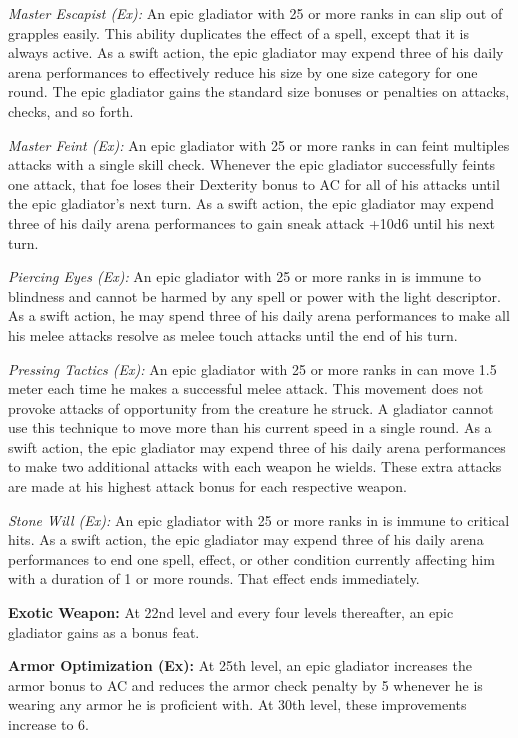 \textit{Master Escapist (Ex):} An epic gladiator with 25 or more ranks in  can slip out of grapples easily. This ability duplicates the effect of a  spell, except that it is always active. As a swift action, the epic gladiator may expend three of his daily arena performances to effectively reduce his size by one size category for one round. The epic gladiator gains the standard size bonuses or penalties on attacks,  checks, and so forth.

\textit{Master Feint (Ex):} An epic gladiator with 25 or more ranks in  can feint multiples attacks with a single skill check. Whenever the epic gladiator successfully feints one attack, that foe loses their Dexterity bonus to AC for all of his attacks until the epic gladiator's next turn. As a swift action, the epic gladiator may expend three of his daily arena performances to gain sneak attack +10d6 until his next turn.

\textit{Piercing Eyes (Ex):} An epic gladiator with 25 or more ranks in  is immune to blindness and cannot be harmed by any spell or power with the light descriptor. As a swift action, he may spend three of his daily arena performances to make all his melee attacks resolve as melee touch attacks until the end of his turn.

\textit{Pressing Tactics (Ex):} An epic gladiator with 25 or more ranks in  can move 1.5 meter each time he makes a successful melee attack. This movement does not provoke attacks of opportunity from the creature he struck. A gladiator cannot use this technique to move more than his current speed in a single round. As a swift action, the epic gladiator may expend three of his daily arena performances to make two additional attacks with each weapon he wields. These extra attacks are made at his highest attack bonus for each respective weapon.

\textit{Stone Will (Ex):} An epic gladiator with 25 or more ranks in  is immune to critical hits. As a swift action, the epic gladiator may expend three of his daily arena performances to end one spell, effect, or other condition currently affecting him with a duration of 1 or more rounds. That effect ends immediately.

\textbf{Exotic Weapon:} At 22nd level and every four levels thereafter, an epic gladiator gains  as a bonus feat.

\textbf{Armor Optimization (Ex):} At 25th level, an epic gladiator increases the armor bonus to AC and reduces the armor check penalty by 5 whenever he is wearing any armor he is proficient with. At 30th level, these improvements increase to 6.
